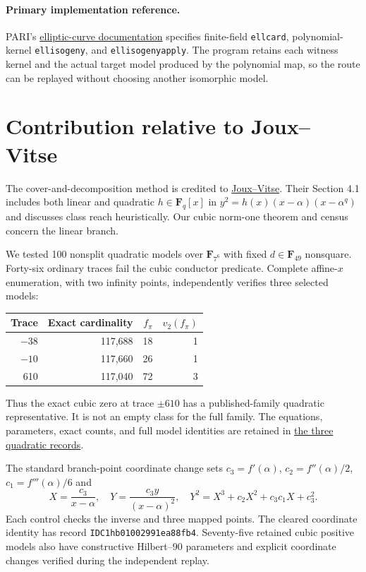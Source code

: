 \documentclass[11pt]{article}
\newcommand{\F}{\mathbf F}
\begin{document}
\paragraph{Primary implementation reference.}
PARI's \href{https://pari.math.u-bordeaux.fr/dochtml/html/Elliptic_curves.html}{elliptic-curve documentation}
specifies finite-field \texttt{ellcard}, polynomial-kernel \texttt{ellisogeny},
and \texttt{ellisogenyapply}. The program retains each witness kernel and
the actual target model produced by the polynomial map, so the route can
be replayed without choosing another isomorphic model.
\section{Contribution relative to Joux--Vitse}
The cover-and-decomposition method is credited to
\href{https://www.iacr.org/archive/eurocrypt2012/72370010/72370010.pdf}{Joux--Vitse}.
Their Section 4.1 includes both linear and quadratic $h\in\F_q[x]$ in
$y^2=h(x)(x-\alpha)(x-\alpha^q)$ and discusses class reach heuristically.
Our cubic norm-one theorem and census concern the linear branch.

We tested 100 nonsplit quadratic models over $\F_{7^6}$ with fixed
$d\in\F_{49}$ nonsquare. Forty-six ordinary traces fail the cubic
conductor predicate. Complete affine-$x$ enumeration, with two infinity
points, independently verifies three selected models:
\begin{center}
\begin{tabular}{rrrr}
\toprule
Trace & Exact cardinality & $f_\pi$ & $v_2(f_\pi)$\\
\midrule
$-38$ & 117,688 & 18 & 1\\
$-10$ & 117,660 & 26 & 1\\
610 & 117,040 & 72 & 3\\
\bottomrule
\end{tabular}
\end{center}
Thus the exact cubic zero at trace $\pm610$ has a published-family
quadratic representative. It is not an empty class for the full family.
The equations, parameters, exact counts, and full model identities
are retained in \href{quadratic_curve_records.json}{the three quadratic records}.

The standard branch-point coordinate change sets
$c_3=f'(\alpha)$, $c_2=f''(\alpha)/2$, $c_1=f'''(\alpha)/6$ and
\[
 X=\frac{c_3}{x-\alpha},\quad
 Y=\frac{c_3y}{(x-\alpha)^2},\quad
 Y^2=X^3+c_2X^2+c_3c_1X+c_3^2.
\]
Each control checks the inverse and three mapped points.
The cleared coordinate identity has record
\texttt{IDC1hb01002991ea88fb4}.
Seventy-five retained cubic positive models also have constructive
Hilbert--90 parameters and explicit coordinate changes verified during
the independent replay.
\end{document}
